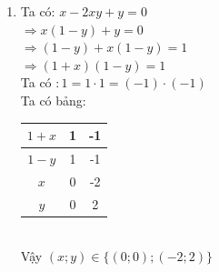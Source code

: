 \begin{bt}
{\begin{enumerate}
$$\begin{aligned}
& \Rightarrow-\left(\frac{1}{2^2}+\frac{1}{3^2}+\frac{1}{4^2}+\ldots+\frac{1}{n^2}\right)>-1 \Rightarrow(n-1)-\left(\frac{1}{2^2}+\frac{1}{3^2}+\frac{1}{4^2}+\ldots+\frac{1}{n^2}\right)>(\mathrm{n}-1)-1 \\[5px]
&=\mathrm{n}-2 . \\[5px]
& \Rightarrow \mathrm{S}>\mathrm{n}-2(2)
\end{aligned}
$$
Từ (1) và (2) suy ra $\mathrm{n}-2<\mathrm{S}<\mathrm{n}-1$ hay $\mathrm{S}$ không là số nguyên.
\item Ta có:
$x-2 x y+y=0$ \\[5px]
$\Rightarrow x(1-y)+y=0$ \\[5px]
$\Rightarrow(1-y)+x(1-y)=1$ \\[5px]
$\Rightarrow(1+x)(1-y)=1$\\[5px]
Ta có $: 1=1 \cdot 1=(-1) \cdot(-1)$\\[5px]
Ta có bảng:\\[5px]
\begin{tabular}{|c|c|c|}
\hline $1+x$ & 1 & -1 \\[5px]
\hline $1-y$ & 1 & -1 \\[5px]
\hline $x$ & 0 & -2 \\[5px]
\hline $y$ & 0 & 2 \\[5px]
\hline
\end{tabular}\\[5px]
Vậy $(x ; y) \in\{(0 ; 0) ;(-2 ; 2)\}$
    \end{enumerate}
} 
\end{bt}

